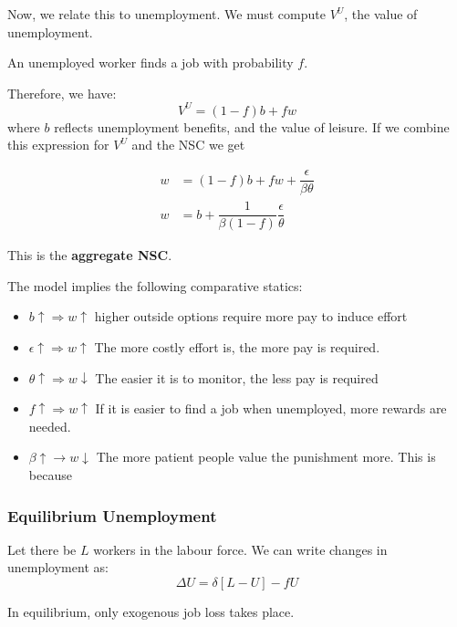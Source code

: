 \documentclass[11pt]{article}
\begin{document}
Now, we relate this to unemployment. We must compute $V^U$, the value of unemployment.
\begin{note}
    An unemployed worker finds a job with probability $f$.
\end{note}
Therefore, we have:
\[V^U = (1-f)b + fw\]
where $b$ reflects unemployment benefits, and the value of leisure.  If we combine this expression for $V^U$ and the NSC we get
\begin{mdframed}
    \begin{equation}
        \label{Aggregate NSC}
        \begin{aligned}
            w &= (1-f)b + fw + \dfrac{\epsilon}{\beta\theta} \\
            w &= b + \dfrac{1}{\beta(1-f)}\dfrac{\epsilon}{\theta}
        \end{aligned}
    \end{equation}

    This is the \textbf{aggregate NSC}.
\end{mdframed}

\begin{shaded}
    The model implies the following comparative statics:
    \begin{itemize}
        \item $b\uparrow \Rightarrow w\uparrow$ higher outside options require more pay to induce effort
        \item  $\epsilon\uparrow\Rightarrow w\uparrow$ The more costly effort is, the more pay is required.
        \item  $\theta\uparrow\Rightarrow w\downarrow$ The easier it is to monitor, the less pay is required
        \item $f\uparrow\Rightarrow w\uparrow$ If it is easier to find a job when unemployed, more rewards are needed.
        \item $\beta\uparrow\rightarrow w\downarrow$ The more patient people value the punishment more. This is because
    \end{itemize}
\end{shaded}

\subsubsection{Equilibrium Unemployment}

Let there be $L$ workers in the labour force. We can write changes in unemployment as:
\[\Delta U = \delta[L-U] - fU\]
\begin{note}
    In equilibrium, only exogenous job loss takes place.
\end{note}
\end{document}
